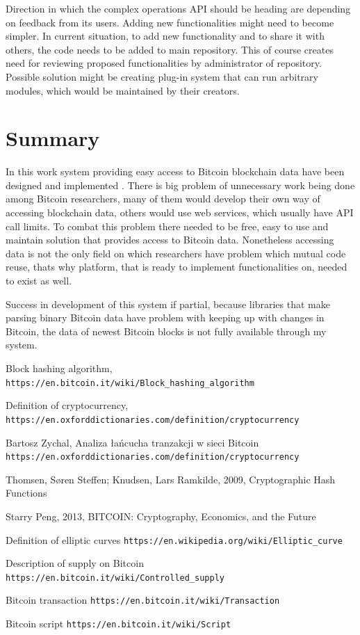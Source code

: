 \documentclass[12pt, en, eng, oneside]{mgr}
\begin{document}
Direction in which the complex operations API should be heading are depending on feedback from its users. Adding new functionalities might need to become simpler. In current situation, to add new functionality and to share it with others, the code needs to be added to main repository. This of course creates need for reviewing proposed functionalities by administrator of repository. Possible solution might be creating plug-in system that can run arbitrary modules, which would be maintained by their creators. 

\chapter{Summary}
In this work system providing easy access to Bitcoin blockchain data have been designed and implemented . There is big problem of unnecessary work being done among Bitcoin researchers, many of them would develop their own way of accessing blockchain data, others would use web services, which usually have API call limits. To combat this problem there needed to be free, easy to use and maintain solution that provides access to Bitcoin data. 
Nonetheless accessing data is not the only field on which researchers have problem which mutual code reuse, thats why platform, that is ready to implement functionalities on, needed to exist as well. 

Success in development of this system if partial, because libraries that make parsing binary Bitcoin data have problem with keeping up with changes in Bitcoin, the data of newest Bitcoin blocks is not fully available through my system.    
   

\begin{thebibliography}{9}
 
Block hashing algorithm,
\texttt{https://en.bitcoin.it/wiki/Block\_hashing\_algorithm}

Definition of cryptocurrency,
\texttt{https://en.oxforddictionaries.com/definition/cryptocurrency}

Bartosz Zychal, Analiza łańcucha tranzakcji w sieci Bitcoin
\texttt{https://en.oxforddictionaries.com/definition/cryptocurrency}

Thomsen, Søren Steffen; Knudsen, Lars Ramkilde, 2009, Cryptographic Hash Functions

Starry Peng, 2013, BITCOIN: Cryptography, Economics, and the Future

Definition of elliptic curves
\texttt{https://en.wikipedia.org/wiki/Elliptic\_curve}

Description of supply on Bitcoin
\texttt{https://en.bitcoin.it/wiki/Controlled\_supply}

Bitcoin transaction
\texttt{https://en.bitcoin.it/wiki/Transaction}

Bitcoin script
\texttt{https://en.bitcoin.it/wiki/Script}

\end{thebibliography}
\end{document}
